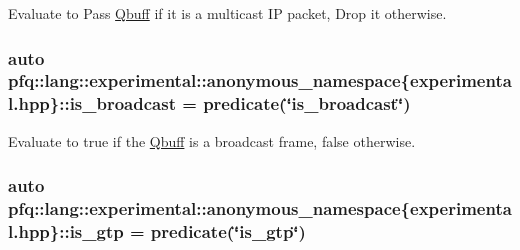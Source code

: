 Evaluate to {\ttfamily Pass} \hyperlink{structpfq_1_1lang_1_1Qbuff}{Qbuff} if it is a multicast IP packet, {\ttfamily Drop} it otherwise. 

\subsubsection[{\texorpdfstring{is\+\_\+broadcast}{is_broadcast}}]{\setlength{\rightskip}{0pt plus 5cm}auto pfq\+::lang\+::experimental\+::anonymous\+\_\+namespace\{experimental.\+hpp\}\+::is\+\_\+broadcast = {\bf predicate}(\char`\"{}is\+\_\+broadcast\char`\"{})}\hypertarget{namespacepfq_1_1lang_1_1experimental_1_1anonymous__namespace_02experimental_8hpp_03_aa9e352437ab1621e226173bc1d900b96}{}\label{namespacepfq_1_1lang_1_1experimental_1_1anonymous__namespace_02experimental_8hpp_03_aa9e352437ab1621e226173bc1d900b96}


Evaluate to {\ttfamily true} if the \hyperlink{structpfq_1_1lang_1_1Qbuff}{Qbuff} is a broadcast frame, {\ttfamily false} otherwise. 

\subsubsection[{\texorpdfstring{is\+\_\+gtp}{is_gtp}}]{\setlength{\rightskip}{0pt plus 5cm}auto pfq\+::lang\+::experimental\+::anonymous\+\_\+namespace\{experimental.\+hpp\}\+::is\+\_\+gtp = {\bf predicate}(\char`\"{}is\+\_\+gtp\char`\"{})}\hypertarget{namespacepfq_1_1lang_1_1experimental_1_1anonymous__namespace_02experimental_8hpp_03_a2eb9e54a6fc6170b246cf3149445a2c4}{}\label{namespacepfq_1_1lang_1_1experimental_1_1anonymous__namespace_02experimental_8hpp_03_a2eb9e54a6fc6170b246cf3149445a2c4}


